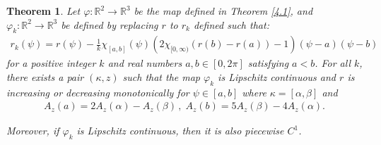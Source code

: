 \documentclass{amsart}
\theoremstyle{plain}
\newtheorem{theorem}{Theorem}[section]
\theoremstyle{definition}
\theoremstyle{remark}
\begin{document}
\begin{theorem}\label{4.4}%
Let $\varphi:{\mathbb R}^2\to{\mathbb R}^3$ be the map defined in Theorem \ref{4.1}, and $\varphi_k:{\mathbb R}^2\to{\mathbb R}^3$ be defined by replacing $r$ to $r_k$ defined such that:
\begin{align*}
r_k(\psi)=r(\psi)-\frac1k\chi_{[a,b]}(\psi)\left(2\chi_{[0,\infty)}(r(b)-r(a))-1\right)(\psi-a)(\psi-b)
\end{align*}
for a positive integer $k$ and real numbers $a,b\in[0,2\pi]$ satisfying $a<b$.
For all $k$, there exists a pair $(\kappa,z)$ such that the map $\varphi_k$ is Lipschitz continuous and $r$ is increasing or decreasing monotonically for $\psi\in[a,b]$ where $\kappa=[\alpha,\beta]$ and
\begin{align*}
A_z(a)=2A_z(\alpha)-A_z(\beta)\,,\;A_z(b)=5A_z(\beta)-4A_z(\alpha).
\end{align*}

Moreover, if $\varphi_k$ is Lipschitz continuous, then it is also piecewise $C^1$.
\end{theorem}
\end{document}
